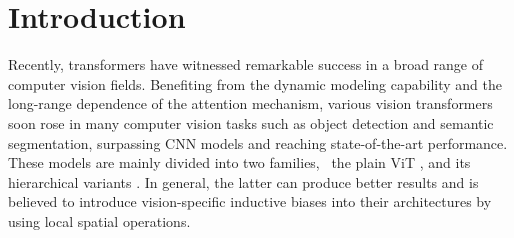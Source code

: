 \documentclass{article} \usepackage{iclr2023_conference,times}
\begin{document}
\section{Introduction}
\label{sec:introduction}
Recently, transformers have witnessed remarkable success in a broad range of computer vision fields.
Benefiting from the dynamic modeling capability and the long-range dependence of the attention mechanism, various vision transformers~\citep{dosovitskiy2020image,chen2021simple,han2021transformer,li2021localvit,wu2022p2t} soon rose in many computer vision tasks such as object detection and semantic segmentation, surpassing CNN models and reaching state-of-the-art performance.
These models are mainly divided into two families, \ie~the plain ViT \citep{dosovitskiy2020image, touvron2021training}, and its hierarchical variants \citep{dong2021cswin,liu2021swin,wang2021pyramid, wang2021pvtv2}.
In general, the latter can produce better results and is believed to introduce vision-specific inductive biases into their architectures by using local spatial operations.
\end{document}
